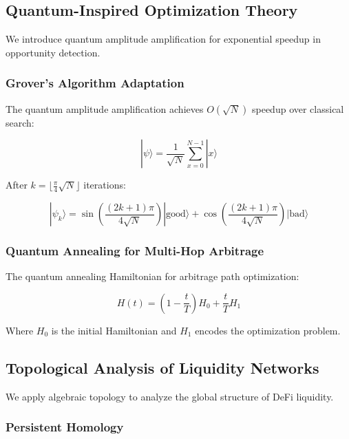 \documentclass[12pt]{article}
\begin{document}
\subsection{Quantum-Inspired Optimization Theory}

We introduce quantum amplitude amplification for exponential speedup in opportunity detection.

\subsubsection{Grover's Algorithm Adaptation}

The quantum amplitude amplification achieves $O(\sqrt{N})$ speedup over classical search:

\begin{equation}
|\psi\rangle = \frac{1}{\sqrt{N}} \sum_{x=0}^{N-1} |x\rangle
\end{equation}

After $k = \lfloor \frac{\pi}{4}\sqrt{N} \rfloor$ iterations:

\begin{equation}
|\psi_k\rangle = \sin\left(\frac{(2k+1)\pi}{4\sqrt{N}}\right)|\text{good}\rangle + \cos\left(\frac{(2k+1)\pi}{4\sqrt{N}}\right)|\text{bad}\rangle
\end{equation}

\subsubsection{Quantum Annealing for Multi-Hop Arbitrage}

The quantum annealing Hamiltonian for arbitrage path optimization:

\begin{equation}
H(t) = \left(1-\frac{t}{T}\right)H_0 + \frac{t}{T}H_1
\end{equation}

Where $H_0$ is the initial Hamiltonian and $H_1$ encodes the optimization problem.

\subsection{Topological Analysis of Liquidity Networks}

We apply algebraic topology to analyze the global structure of DeFi liquidity.

\subsubsection{Persistent Homology}
\end{document}

